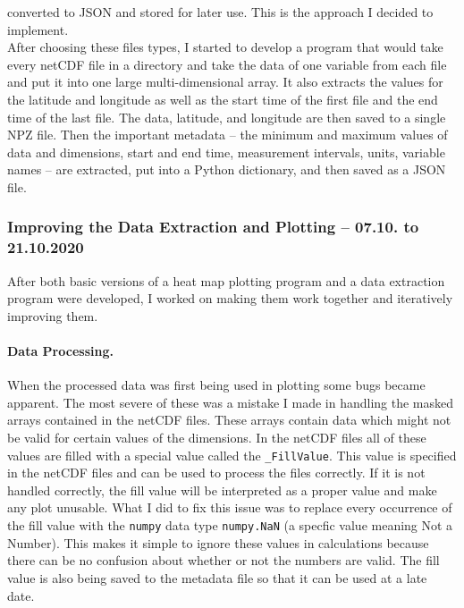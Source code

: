 \documentclass[../00_main.tex]{subfiles}
\begin{document}
converted to JSON and stored for later use. This is the approach I decided to
implement.\\
After choosing these files types, I started to develop a program that would
take every netCDF file in a directory and take the data of one variable from
each file and put it into one large multi-dimensional array. It also extracts
the values for the latitude and longitude as well as the start time of the
first file and the end time of the last file. The data, latitude, and longitude
are then saved to a single NPZ file. Then the important metadata -- the minimum
and maximum values of data and dimensions, start and end time, measurement
intervals, units, variable names -- are extracted, put into a Python
dictionary, and then saved as a JSON file.

\subsubsection{Improving the Data Extraction and Plotting -- 07.10. to
21.10.2020}

After both basic versions of a heat map plotting program and a data extraction
program were developed, I worked on making them work together and
iteratively improving them.

\paragraph{Data Processing.}

When the processed data was first being used in plotting some bugs became
apparent. The most severe of these was a mistake I made in handling the masked
arrays contained in the netCDF files. These arrays contain data which might not
be valid for certain values of the dimensions. In the netCDF files all of these
values are filled with a special value called the \texttt{\_FillValue}. This
value is specified in the netCDF files and can be used to process the files
correctly. If it is not handled correctly, the fill value will be interpreted
as a proper value and make any plot unusable. What I did to fix this issue was
to replace every occurrence of the fill value with the \texttt{numpy} data type
\texttt{numpy.NaN} (a specfic value meaning Not a Number). This makes it simple
to ignore these values in calculations because there can be no confusion about
whether or not the numbers are valid. The fill value is also being saved to the
metadata file so that it can be used at a late date.
\end{document}
